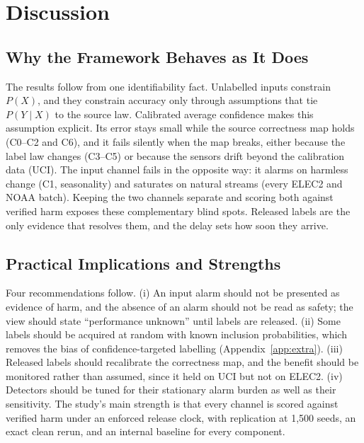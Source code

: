 \section{Discussion}
\label{sec:discussion}

\subsection{Why the Framework Behaves as It Does}
The results follow from one identifiability fact. Unlabelled inputs constrain $P(X)$,
and they constrain accuracy only through assumptions that tie $P(Y\mid X)$ to the
source law. Calibrated average confidence makes this assumption explicit. Its error
stays small while the source correctness map holds (C0--C2 and C6), and it fails
silently when the map breaks, either because the label law changes (C3--C5) or because
the sensors drift beyond the calibration data (UCI). The input channel fails in the
opposite way: it alarms on harmless change (C1, seasonality) and saturates on natural
streams (every ELEC2 and NOAA batch). Keeping the two channels separate and scoring
both against verified harm exposes these complementary blind spots. Released labels
are the only evidence that resolves them, and the delay sets how soon they arrive.

\subsection{Practical Implications and Strengths}
Four recommendations follow. (i) An input alarm should not be presented as evidence
of harm, and the absence of an alarm should not be read as safety; the view should
state ``performance unknown'' until labels are released. (ii) Some labels should be
acquired at random with known inclusion probabilities, which removes the bias of
confidence-targeted labelling (Appendix~\ref{app:extra}). (iii) Released labels should
recalibrate the correctness map, and the benefit should be monitored rather than
assumed, since it held on UCI but not on ELEC2. (iv) Detectors should be tuned for
their stationary alarm burden as well as their sensitivity. The study's main strength
is that every channel is scored against verified harm under an enforced release
clock, with replication at 1,500 seeds, an exact clean rerun, and an internal baseline
for every component.

